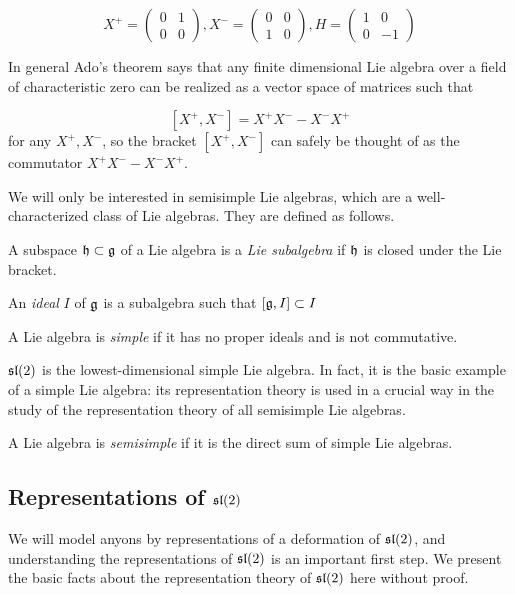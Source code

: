 \begin{equation}
    X^+ = \begin{pmatrix} 0 & 1 \\ 0 & 0 \end{pmatrix},
    X^- = \begin{pmatrix} 0 & 0 \\ 1 & 0 \end{pmatrix}, 
    H = \begin{pmatrix} 1 & 0 \\ 0 &-1 \end{pmatrix}
\end{equation}

In general Ado's theorem says that any finite dimensional Lie algebra over a
field of characteristic zero can be realized as a vector space of matrices such
that 

\[ \left[ X^+,X^- \right] = X^+X^- - X^-X^+\] 
for any $X^+,X^-$, so the bracket $[X^+,X^-]$ can safely be thought of
as the commutator $X^+X^- - X^-X^+$. 


We will only be interested in semisimple Lie algebras, which are a
well-characterized class of Lie algebras. They are defined as follows.

\begin{defn}
    A subspace $\mathfrak{h} \subset \mathfrak{g}$ of a Lie algebra is a
    \emph{Lie subalgebra} if $\mathfrak{h}$ is closed under the Lie bracket. 

    An \emph{ideal} $I$ of $\mathfrak{g}$ is a subalgebra such that
    $[\mathfrak{g}, I] \subset I$
\end{defn}

\begin{defn}
    A Lie algebra is \emph{simple} if it has no proper ideals and is not
    commutative. 
\end{defn}

$\mathfrak{sl}(2)$ is the lowest-dimensional simple Lie algebra. In fact, it is the
basic example of a simple Lie algebra: its representation theory is used in a
crucial way in the study of the representation theory of all semisimple Lie
algebras.

\begin{defn}
    A Lie algebra is \emph{semisimple} if it is the direct sum of simple Lie
    algebras.
\end{defn}

\subsection{Representations of $\mathfrak{sl}(2)$}
\label{subsection:RepsOfSL2}
We will model anyons by representations of a deformation of $\mathfrak{sl}(2)$, and
understanding the representations of $\mathfrak{sl}(2)$ is an important first step. We
present the basic facts about the representation theory of $\mathfrak{sl}(2)$ here
without proof.

